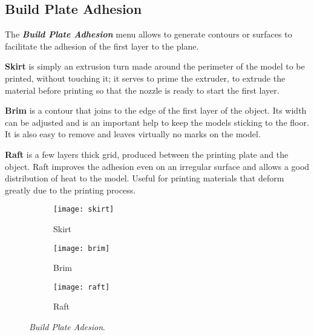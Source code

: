 \newpage
	
\subsection{Build Plate Adhesion}
The \emph{\textbf{Build Plate Adhesion}} menu allows to generate contours or surfaces to facilitate the adhesion of the first layer to the plane.

\textbf{Skirt} is simply an extrusion turn made around the perimeter of the model to be printed, without touching it; it serves to prime the extruder, to extrude the material before printing so that the nozzle is ready to start the first layer.

\textbf{Brim} is a contour that joins to the edge of the first layer of the object. Its width can be adjusted and is an important help to keep the models sticking to the floor. It is also easy to remove and leaves virtually no marks on the model.

\textbf{Raft} is a few layers thick grid, produced between the printing plate and the object. Raft improves the adhesion even on an irregular surface and allows a good distribution of heat to the model. Useful for printing materials that deform greatly due to the printing process.

\begin{figure}[h]

\begin{subfigure}{0.3\textwidth}
\centering
\texttt{[image: skirt]} 
\caption{Skirt}
\label{fig:skirt}
\end{subfigure}
\begin{subfigure}{0.3\textwidth}
\centering
\texttt{[image: brim]}
\caption{Brim}
\label{fig:brim}
\end{subfigure}
\begin{subfigure}{0.3\textwidth}
\centering
\texttt{[image: raft]}
\caption{Raft}
\label{fig:raft}
\end{subfigure}

\caption{\emph{Build Plate Adesion}.}
\label{fig:Build Plate Adesion}
\end{figure}
\vspace{-10pt}



